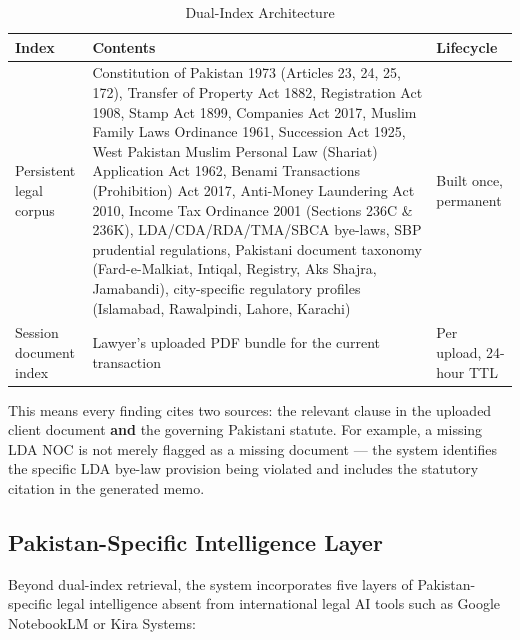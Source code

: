 \documentclass[12pt, a4paper]{article}
\begin{document}
\begin{table}[H]
\centering
\caption{Dual-Index Architecture}
\renewcommand{\arraystretch}{1.3}
\begin{tabularx}{\textwidth}{lXl}
\toprule
\textbf{Index} & \textbf{Contents} & \textbf{Lifecycle} \\
\midrule
Persistent legal corpus
    & Constitution of Pakistan 1973 (Articles 23, 24, 25, 172),
      Transfer of Property Act 1882, Registration Act 1908,
      Stamp Act 1899, Companies Act 2017, Muslim Family Laws
      Ordinance 1961, Succession Act 1925, West Pakistan Muslim
      Personal Law (Shariat) Application Act 1962, Benami
      Transactions (Prohibition) Act 2017, Anti-Money Laundering
      Act 2010, Income Tax Ordinance 2001 (Sections 236C \& 236K),
      LDA/CDA/RDA/TMA/SBCA bye-laws, SBP prudential regulations,
      Pakistani document taxonomy (Fard-e-Malkiat, Intiqal, Registry,
      Aks Shajra, Jamabandi), city-specific regulatory profiles
      (Islamabad, Rawalpindi, Lahore, Karachi)
    & Built once, permanent \\
Session document index
    & Lawyer's uploaded PDF bundle for the current transaction
    & Per upload, 24-hour TTL \\
\bottomrule
\end{tabularx}
\label{tab:dualindex}
\end{table}

This means every finding cites two sources: the relevant clause in the uploaded
client document \textbf{and} the governing Pakistani statute. For example, a
missing LDA NOC is not merely flagged as a missing document --- the system
identifies the specific LDA bye-law provision being violated and includes the
statutory citation in the generated memo.

\subsection{Pakistan-Specific Intelligence Layer}

Beyond dual-index retrieval, the system incorporates five layers of
Pakistan-specific legal intelligence absent from international legal AI tools
such as Google NotebookLM or Kira Systems:
\end{document}
